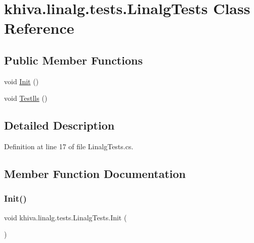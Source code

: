 \hypertarget{classkhiva_1_1linalg_1_1tests_1_1_linalg_tests}{}\section{khiva.\+linalg.\+tests.\+Linalg\+Tests Class Reference}
\label{classkhiva_1_1linalg_1_1tests_1_1_linalg_tests}
\subsection*{Public Member Functions}
\begin{DoxyCompactItemize}
\item 
void \mbox{\hyperlink{classkhiva_1_1linalg_1_1tests_1_1_linalg_tests_a491f9357d2e91964d141d93968543ff2}{Init}} ()
\item 
void \mbox{\hyperlink{classkhiva_1_1linalg_1_1tests_1_1_linalg_tests_a752038ecb5c51c7fca14684fa3e769e6}{Testlls}} ()
\end{DoxyCompactItemize}


\subsection{Detailed Description}


Definition at line 17 of file Linalg\+Tests.\+cs.



\subsection{Member Function Documentation}
\mbox{\label{classkhiva_1_1linalg_1_1tests_1_1_linalg_tests_a491f9357d2e91964d141d93968543ff2}} 
\subsubsection{\texorpdfstring{Init()}{Init()}}
{\footnotesize\ttfamily void khiva.\+linalg.\+tests.\+Linalg\+Tests.\+Init (\begin{DoxyParamCaption}{ }\end{DoxyParamCaption})\hspace{0.3cm}{\ttfamily [inline]}}



